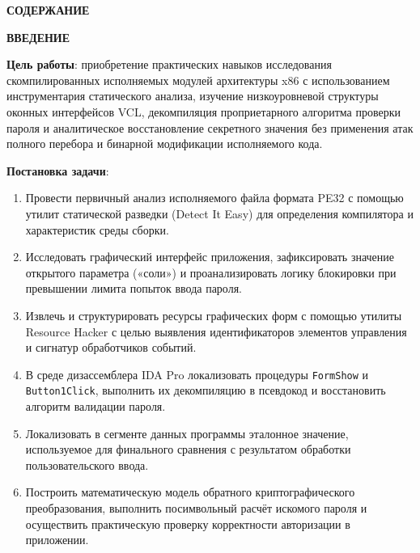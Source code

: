 \documentclass[a4paper]{article}
\begin{document}
\newpage
\pagestyle{plain}
\setcounter{page}{2}

\begin{center}
  {\bfseries СОДЕРЖАНИЕ}
\end{center}
\vspace{12pt}

\tableofcontents

\newpage
\begin{center}
  {\bfseries ВВЕДЕНИЕ}
\end{center}

\textbf{Цель работы}: приобретение практических навыков исследования скомпилированных исполняемых модулей архитектуры x86 с использованием инструментария статического анализа, изучение низкоуровневой структуры оконных интерфейсов VCL, декомпиляция проприетарного алгоритма проверки пароля и аналитическое восстановление секретного значения без применения атак полного перебора и бинарной модификации исполняемого кода.

\textbf{Постановка задачи}:
\begin{enumerate}
  \item Провести первичный анализ исполняемого файла формата PE32 с помощью утилит статической разведки (Detect It Easy) для определения компилятора и характеристик среды сборки.
  \item Исследовать графический интерфейс приложения, зафиксировать значение открытого параметра («соли») и проанализировать логику блокировки при превышении лимита попыток ввода пароля.
  \item Извлечь и структурировать ресурсы графических форм с помощью утилиты Resource Hacker с целью выявления идентификаторов элементов управления и сигнатур обработчиков событий.
  \item В среде дизассемблера IDA Pro локализовать процедуры \texttt{FormShow} и \texttt{Button1Click}, выполнить их декомпиляцию в псевдокод и восстановить алгоритм валидации пароля.
  \item Локализовать в сегменте данных программы эталонное значение, используемое для финального сравнения с результатом обработки пользовательского ввода.
  \item Построить математическую модель обратного криптографического преобразования, выполнить посимвольный расчёт искомого пароля и осуществить практическую проверку корректности авторизации в приложении.
\end{enumerate}
\end{document}
